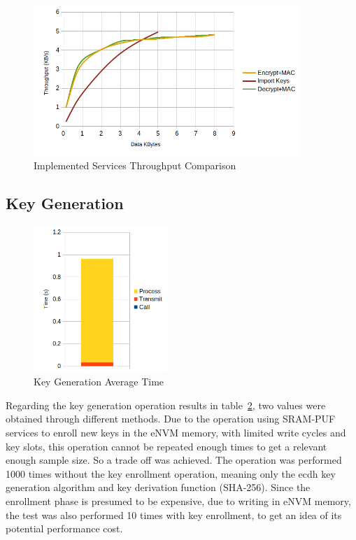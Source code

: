 \begin{figure}[h!]
	\centering
	\includegraphics[width=0.9\textwidth]{./Images/services-compare-tput.png}
	\caption{Implemented Services Throughput Comparison}
	\label{fig:performance:services-tput}
\end{figure}

\subsection{Key Generation}\label{chap:evaluation:services:key-gen}

\begin{figure}[h!]
	\centering
	\includegraphics[width=0.45\textwidth]{./Images/op8-time.png}
	\caption{Key Generation Average Time}
	\label{fig:performance:op8-time}
\end{figure}

Regarding the key generation operation results in table~\ref{fig:performance:op8-time}, two values were obtained through different methods. Due to the operation using SRAM-PUF services to enroll new keys in the eNVM memory, with limited write cycles and key slots, this operation cannot be repeated enough times to get a relevant enough sample size.
So a trade off was achieved. The operation was performed 1000 times without the key enrollment operation, meaning only the ecdh key generation algorithm and key derivation function (SHA-256).
Since the enrollment phase is presumed to be expensive, due to writing in eNVM memory, the test was also performed 10 times with key enrollment, to get an idea of its potential performance cost.

